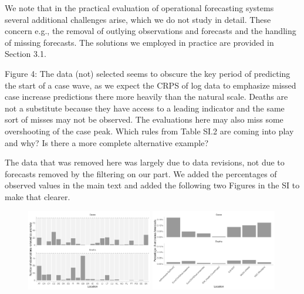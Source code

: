\documentclass{article}
\newcommand{\black}{\color{black}}
\newcommand{\blue}{\color{blue}}
\newcommand{\indented}{\setlength{\leftskip}{1cm}}
\newcommand{\notindented}{\setlength{\leftskip}{0cm}}
\begin{document}
\indented
We note that in the practical evaluation of operational forecasting systems  several additional challenges arise, which we do not study in detail. These concern e.g., the removal of outlying observations and forecasts and the handling of missing forecasts. The solutions we employed in practice are provided in Section 3.1.

\notindented



\blue
Figure 4: The data (not) selected seems to obscure the key period of predicting the start of a case wave, as we expect the CRPS of log data to emphasize missed case increase predictions there more heavily than the natural scale. Deaths are not a substitute because they have access to a leading indicator and the same sort of misses may not be observed. The evaluations here may also miss some overshooting of the case peak. Which rules from Table SI.2 are coming into play and why? Is there a more complete alternative example?

\black
The data that was removed here was largely due to data revisions, not due to forecasts removed by the filtering on our part. 
We added the percentages of observed values in the main text and added the following two Figures in the SI to make that clearer. 

\begin{figure}[h!]
    \centering
    \includegraphics[width=0.49\textwidth]{output/figures/number-anomalies.png}
     \includegraphics[width=0.49\textwidth]{output/figures/erroneous-forecasts.png}
     \caption{}
    \label{fig:number-anomalies}
\end{figure}
\end{document}
